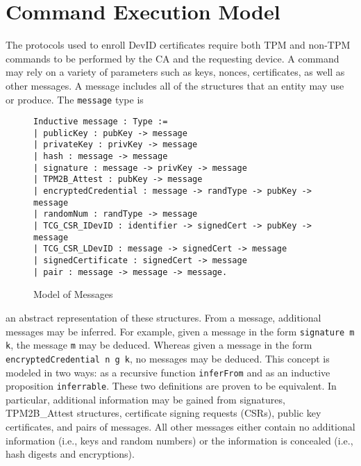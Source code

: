 
\chapter{Command Execution Model}





The protocols used to enroll DevID certificates require both TPM and non-TPM commands to be performed by the CA and the requesting device. A command may rely on a variety of parameters such as keys, nonces, certificates, as well as other messages. A message includes all of the structures that an entity may use or produce. The \verb|message| type is 
\begin{figure}[h]
\begin{lstlisting}[language=Coq]
Inductive message : Type :=
| publicKey : pubKey -> message
| privateKey : privKey -> message
| hash : message -> message
| signature : message -> privKey -> message
| TPM2B_Attest : pubKey -> message
| encryptedCredential : message -> randType -> pubKey -> message
| randomNum : randType -> message
| TCG_CSR_IDevID : identifier -> signedCert -> pubKey -> message
| TCG_CSR_LDevID : message -> signedCert -> message
| signedCertificate : signedCert -> message
| pair : message -> message -> message.
\end{lstlisting}
\caption{Model of Messages}
\end{figure}
an abstract representation of these structures. From a message, additional messages may be inferred. For example, given a message in the form \verb|signature m k|, the message \verb|m| may be deduced. Whereas given a message in the form \verb|encryptedCredential n g k|, no messages may be deduced. This concept is modeled in two ways: as a recursive function \verb|inferFrom| and as an inductive proposition \verb|inferrable|. These two definitions are proven to be equivalent. In particular, additional information may be gained from signatures, TPM2B\_Attest structures, certificate signing requests (CSRs), public key certificates, and pairs of messages. All other messages either contain no additional information (i.e., keys and random numbers) or the information is concealed (i.e., hash digests and encryptions). 



